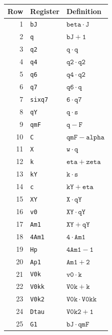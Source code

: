 \documentclass[11pt]{article}
\theoremstyle{remark}
\begin{document}
\begingroup\fontsize{8.5}{10.5}\selectfont
\begin{longtable}{rll}
\toprule
Row & Register & Definition\\
\midrule\endhead
1 & \texttt{bJ} & $\mathtt{beta} \mathbin{\cdot} \mathtt{J}$ \\
2 & \texttt{q} & $\mathtt{bJ} + \mathtt{1}$ \\
3 & \texttt{q2} & $\mathtt{q} \mathbin{\cdot} \mathtt{q}$ \\
4 & \texttt{q4} & $\mathtt{q2} \mathbin{\cdot} \mathtt{q2}$ \\
5 & \texttt{q6} & $\mathtt{q4} \mathbin{\cdot} \mathtt{q2}$ \\
6 & \texttt{q7} & $\mathtt{q6} \mathbin{\cdot} \mathtt{q}$ \\
7 & \texttt{sixq7} & $\mathtt{6} \mathbin{\cdot} \mathtt{q7}$ \\
8 & \texttt{qY} & $\mathtt{q} \mathbin{\cdot} \mathtt{s}$ \\
9 & \texttt{qmF} & $\mathtt{q} - \mathtt{F}$ \\
10 & \texttt{C} & $\mathtt{qmF} - \mathtt{alpha}$ \\
11 & \texttt{X} & $\mathtt{w} \mathbin{\cdot} \mathtt{q}$ \\
12 & \texttt{k} & $\mathtt{eta} + \mathtt{zeta}$ \\
13 & \texttt{kY} & $\mathtt{k} \mathbin{\cdot} \mathtt{s}$ \\
14 & \texttt{c} & $\mathtt{kY} + \mathtt{eta}$ \\
15 & \texttt{XY} & $\mathtt{X} \mathbin{\cdot} \mathtt{qY}$ \\
16 & \texttt{v0} & $\mathtt{XY} \mathbin{\cdot} \mathtt{qY}$ \\
17 & \texttt{Am1} & $\mathtt{XY} + \mathtt{qY}$ \\
18 & \texttt{4Am1} & $\mathtt{4} \mathbin{\cdot} \mathtt{Am1}$ \\
19 & \texttt{Hp} & $\mathtt{4Am1} - \mathtt{1}$ \\
20 & \texttt{Ap1} & $\mathtt{Am1} + \mathtt{2}$ \\
21 & \texttt{V0k} & $\mathtt{v0} \mathbin{\cdot} \mathtt{k}$ \\
22 & \texttt{V0kk} & $\mathtt{V0k} + \mathtt{k}$ \\
23 & \texttt{V0k2} & $\mathtt{V0k} \mathbin{\cdot} \mathtt{V0kk}$ \\
24 & \texttt{Dtau} & $\mathtt{V0k2} + \mathtt{1}$ \\
25 & \texttt{G1} & $\mathtt{bJ} \mathbin{\cdot} \mathtt{qmF}$ \\

\end{longtable}
\end{document}
